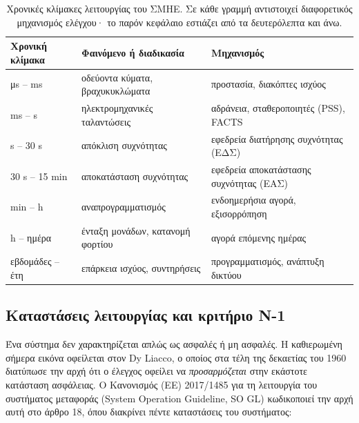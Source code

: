 \begin{table}[!htbp]
\centering
\begin{tabular}{lll}
\hline
Χρονική κλίμακα & Φαινόμενο ή διαδικασία & Μηχανισμός \\
\hline
μs -- ms   & οδεύοντα κύματα, βραχυκυκλώματα & προστασία, διακόπτες ισχύος \\
ms -- s    & ηλεκτρομηχανικές ταλαντώσεις & αδράνεια, σταθεροποιητές (PSS), FACTS \\
s -- 30 s  & απόκλιση συχνότητας         & εφεδρεία διατήρησης συχνότητας (ΕΔΣ) \\
30 s -- 15 min & αποκατάσταση συχνότητας & εφεδρεία αποκατάστασης συχνότητας (ΕΑΣ) \\
min -- h   & αναπρογραμματισμός          & ενδοημερήσια αγορά, εξισορρόπηση \\
h -- ημέρα & ένταξη μονάδων, κατανομή φορτίου & αγορά επόμενης ημέρας \\
εβδομάδες -- έτη & επάρκεια ισχύος, συντηρήσεις & προγραμματισμός, ανάπτυξη δικτύου \\
\hline
\end{tabular}
\caption{Χρονικές κλίμακες λειτουργίας του ΣΜΗΕ. Σε κάθε γραμμή αντιστοιχεί διαφορετικός
μηχανισμός ελέγχου· το παρόν κεφάλαιο εστιάζει από τα δευτερόλεπτα και άνω.}
\label{tab:chronikes-klimakes}
\end{table}

\subsection{Καταστάσεις λειτουργίας και κριτήριο N-1}

Ένα σύστημα δεν χαρακτηρίζεται απλώς ως ασφαλές ή μη ασφαλές. Η καθιερωμένη σήμερα εικόνα
οφείλεται στον Dy Liacco, ο οποίος στα τέλη της δεκαετίας του 1960 διατύπωσε την αρχή ότι
ο έλεγχος οφείλει να \emph{προσαρμόζεται} στην εκάστοτε κατάσταση ασφάλειας. Ο Κανονισμός (ΕΕ) 2017/1485 για τη λειτουργία του
συστήματος μεταφοράς (System Operation Guideline, SO GL) κωδικοποιεί την αρχή αυτή στο
άρθρο 18, όπου διακρίνει πέντε καταστάσεις του συστήματος:


